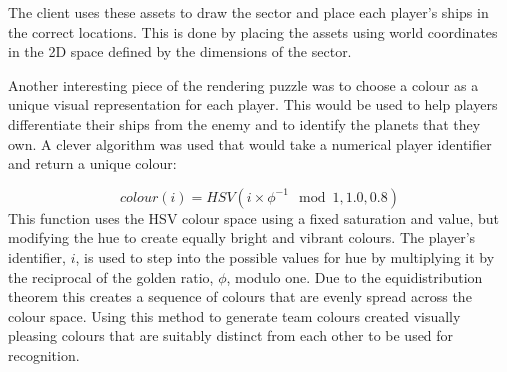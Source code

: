 The client uses these assets to draw the sector and place each player's ships in the correct locations. This is done by placing the assets using world coordinates in the 2D space defined by the dimensions of the sector.

Another interesting piece of the rendering puzzle was to choose a colour as a unique visual representation for each player. This would be used to help players differentiate their ships from the enemy and to identify the planets that they own. A clever algorithm was used that would take a numerical player identifier and return a unique colour:\cite{ankerl2009}

\begin{equation*}
	colour(i) = HSV(i \times \phi^{-1} \mod 1, 1.0, 0.8)
\end{equation*}
\noindent
This function uses the HSV colour space using a fixed saturation and value, but modifying the hue to create equally bright and vibrant colours. The player's identifier, $i$, is used to step into the possible values for hue by multiplying it by the reciprocal of the golden ratio, $\phi$, modulo one. Due to the equidistribution theorem this creates a sequence of colours that are evenly spread across the colour space. Using this method to generate team colours created visually pleasing colours that are suitably distinct from each other to be used for recognition.
